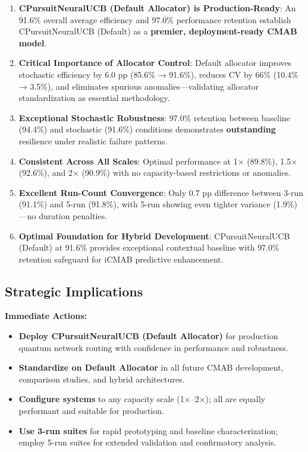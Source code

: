\documentclass[12pt,a4paper]{article}
\newcommand{\success}[1]{\textcolor{successcolor}{\textbf{#1}}}
\begin{document}
\begin{enumerate}
\item \success{\textbf{CPursuitNeuralUCB (Default Allocator) is Production-Ready}}: An 91.6\% overall average efficiency and 97.0\% performance retention establish CPursuitNeuralUCB (Default) as a \success{premier, deployment-ready CMAB model}.

\item \success{\textbf{Critical Importance of Allocator Control}}: Default allocator improves stochastic efficiency by 6.0 pp (85.6\% → 91.6\%), reduces CV by 66\% (10.4\% → 3.5\%), and eliminates spurious anomalies—validating allocator standardization as essential methodology.

\item \success{\textbf{Exceptional Stochastic Robustness}}: 97.0\% retention between baseline (94.4\%) and stochastic (91.6\%) conditions demonstrates \textbf{outstanding} resilience under realistic failure patterns.

\item \success{\textbf{Consistent Across All Scales}}: Optimal performance at 1$\times$ (89.8\%), 1.5$\times$ (92.6\%), and 2$\times$ (90.9\%) with no capacity-based restrictions or anomalies.

\item \success{\textbf{Excellent Run-Count Convergence}}: Only 0.7 pp difference between 3-run (91.1\%) and 5-run (91.8\%), with 5-run showing even tighter variance (1.9\%)—no duration penalties.

\item \success{\textbf{Optimal Foundation for Hybrid Development}}: CPursuitNeuralUCB (Default) at 91.6\% provides exceptional contextual baseline with 97.0\% retention safeguard for iCMAB predictive enhancement.
\end{enumerate}

\subsection{Strategic Implications}

\textbf{Immediate Actions:}
\begin{itemize}
\item \success{Deploy CPursuitNeuralUCB (Default Allocator)} for production quantum network routing with confidence in performance and robustness.

\item \success{Standardize on Default Allocator} in all future CMAB development, comparison studies, and hybrid architectures.

\item \success{Configure systems} to any capacity scale (1$\times$--2$\times$); all are equally performant and suitable for production.

\item \success{Use 3-run suites} for rapid prototyping and baseline characterization; employ 5-run suites for extended validation and confirmatory analysis.
\end{itemize}
\end{document}

